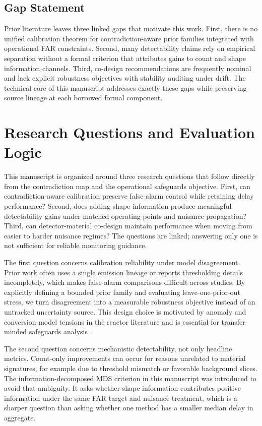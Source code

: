 \documentclass{article} %
\begin{document}
\subsection{Gap Statement}
Prior literature leaves three linked gaps that motivate this work. First, there is no unified calibration theorem for contradiction-aware prior families integrated with operational FAR constraints. Second, many detectability claims rely on empirical separation without a formal criterion that attributes gains to count and shape information channels. Third, co-design recommendations are frequently nominal and lack explicit robustness objectives with stability auditing under drift. The technical core of this manuscript addresses exactly these gaps while preserving source lineage at each borrowed formal component.

\section{Research Questions and Evaluation Logic}\label{sec:research_questions}
This manuscript is organized around three research questions that follow directly from the contradiction map and the operational safeguards objective. First, can contradiction-aware calibration preserve false-alarm control while retaining delay performance? Second, does adding shape information produce meaningful detectability gains under matched operating points and nuisance propagation? Third, can detector-material co-design maintain performance when moving from easier to harder nuisance regimes? The questions are linked; answering only one is not sufficient for reliable monitoring guidance.

The first question concerns calibration reliability under model disagreement. Prior work often uses a single emission lineage or reports thresholding details incompletely, which makes false-alarm comparisons difficult across studies. By explicitly defining a bounded prior family and evaluating leave-one-prior-out stress, we turn disagreement into a measurable robustness objective instead of an untracked uncertainty source. This design choice is motivated by anomaly and conversion-model tensions in the reactor literature and is essential for transfer-minded safeguards analysis \citep{SRC005,SRC015,SRC029,SRC030,SRC031}.

The second question concerns mechanistic detectability, not only headline metrics. Count-only improvements can occur for reasons unrelated to material signatures, for example due to threshold mismatch or favorable background slices. The information-decomposed MDS criterion in this manuscript was introduced to avoid that ambiguity. It asks whether shape information contributes positive information under the same FAR target and nuisance treatment, which is a sharper question than asking whether one method has a smaller median delay in aggregate.
\end{document}
